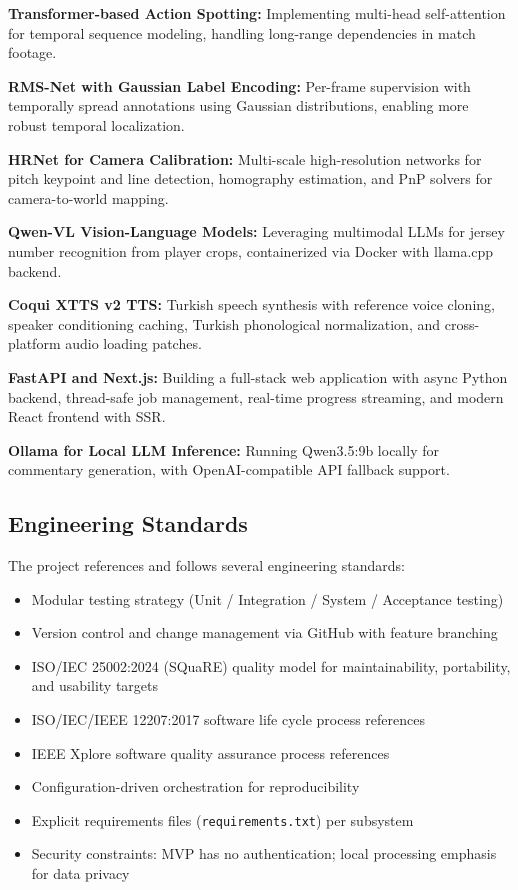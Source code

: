 \documentclass[10pt,twocolumn,a4paper]{article}
\begin{document}
\textbf{Transformer-based Action Spotting:} Implementing multi-head self-attention for temporal sequence modeling, handling long-range dependencies in match footage.

\textbf{RMS-Net with Gaussian Label Encoding:} Per-frame supervision with temporally spread annotations using Gaussian distributions, enabling more robust temporal localization.

\textbf{HRNet for Camera Calibration:} Multi-scale high-resolution networks for pitch keypoint and line detection, homography estimation, and PnP solvers for camera-to-world mapping.

\textbf{Qwen-VL Vision-Language Models:} Leveraging multimodal LLMs for jersey number recognition from player crops, containerized via Docker with llama.cpp backend.

\textbf{Coqui XTTS v2 TTS:} Turkish speech synthesis with reference voice cloning, speaker conditioning caching, Turkish phonological normalization, and cross-platform audio loading patches.

\textbf{FastAPI and Next.js:} Building a full-stack web application with async Python backend, thread-safe job management, real-time progress streaming, and modern React frontend with SSR.

\textbf{Ollama for Local LLM Inference:} Running Qwen3.5:9b locally for commentary generation, with OpenAI-compatible API fallback support.

\subsection{Engineering Standards}

The project references and follows several engineering standards:
\begin{itemize}[noitemsep,topsep=0pt]
  \item Modular testing strategy (Unit / Integration / System / Acceptance testing)
  \item Version control and change management via GitHub with feature branching
  \item ISO/IEC 25002:2024 (SQuaRE) quality model for maintainability, portability, and usability targets
  \item ISO/IEC/IEEE 12207:2017 software life cycle process references
  \item IEEE Xplore software quality assurance process references
  \item Configuration-driven orchestration for reproducibility
  \item Explicit requirements files (\texttt{requirements.txt}) per subsystem
  \item Security constraints: MVP has no authentication; local processing emphasis for data privacy
\end{itemize}
\end{document}
